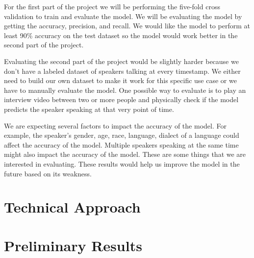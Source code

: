\documentclass[10pt,twocolumn,letterpaper]{article}
\begin{document}
For the first part of the project we will be performing the five-fold cross validation to train and evaluate  the model. We will be evaluating the model by getting the accuracy, precision, and recall. We would like the model to perform at least 90\% accuracy on the test dataset so the model would work better in the second part of the project. 

Evaluating the second part of the project would be slightly harder because we don’t have a labeled dataset of speakers talking at every timestamp. We either need to build our own dataset to make it work for this specific use case or we have to manually evaluate the model. One possible way to evaluate is to play an interview video between two or more people and physically check if the model predicts the speaker speaking at that very point of time. 

We are expecting several factors to impact the accuracy of the model. For example, the speaker’s gender, age, race, language, dialect of a language could affect the accuracy of the model. Multiple speakers speaking at the same time might also impact the accuracy of the model. These are some things that we are interested in evaluating. These results would help us improve the model in the future based on its weakness. 


\section{Technical Approach}





\section{Preliminary Results}





{\small


}
\end{document}
